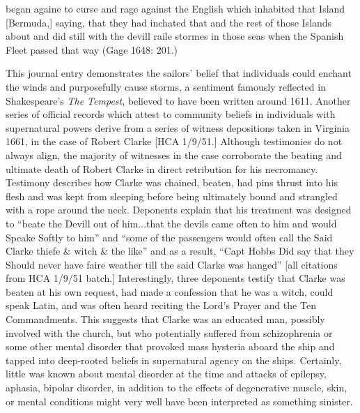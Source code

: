 \begin{styleStandard}
began againe to curse and rage against the English which inhabited that Island [Bermuda,] saying, that they had inchated that and the rest of those Islands about and did still with the devill raile stormes in those seas when the Spanish Fleet passed that way (Gage 1648: 201.) 
\end{styleStandard}

\begin{styleStandard}
This journal entry demonstrates the sailors’ belief that individuals could enchant the winds and purposefully cause storms, a sentiment famously reflected in Shakespeare’s \textit{The Tempest}, believed to have been written around 1611. Another series of official records which attest to community beliefs in individuals with supernatural powers derive from a series of witness depositions taken in Virginia 1661, in the case of Robert Clarke [HCA 1/9/51.] Although testimonies do not always align, the majority of witnesses in the case corroborate the beating and ultimate death of Robert Clarke in direct retribution for his necromancy. Testimony describes how Clarke was chained, beaten, had pins thrust into his flesh and was kept from sleeping before being ultimately bound and strangled with a rope around the neck. Deponents explain that his treatment was designed to “beate the Devill out of him...that the devils came often to him and would Speake Softly to him” and “some of the passengers would often call the Said Clarke thiefe \& witch \& the like” and as a result, “Capt Hobbs Did say that they Should never have faire weather till the said Clarke was hanged” [all citations from HCA 1/9/51 batch.] Interestingly, three deponents testify that Clarke was beaten at his own request, had made a confession that he was a witch, could speak Latin, and was often heard reciting the Lord’s Prayer and the Ten Commandments. This suggests that Clarke was an educated man, possibly involved with the church, but who potentially suffered from schizophrenia or some other mental disorder that provoked mass hysteria aboard the ship and tapped into deep-rooted beliefs in supernatural agency on the ships. Certainly, little was known about mental disorder at the time and attacks of epilepsy, aphasia, bipolar disorder, in addition to the effects of degenerative muscle, skin, or mental conditions might very well have been interpreted as something sinister. 
\end{styleStandard}

